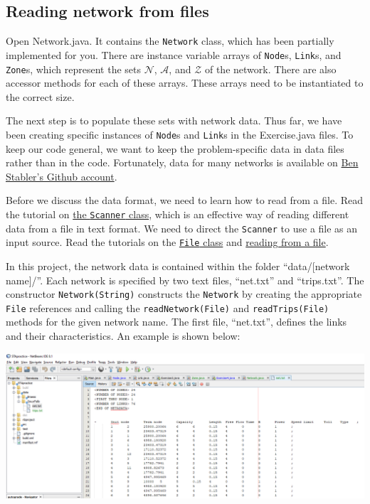 \documentclass[12pt]{article}
\newcommand{\N}{\mathcal{N}}
\newcommand{\A}{\mathcal{A}}
\newcommand{\Z}{\mathcal{Z}}
\begin{document}

\subsection{Reading network from files}
\label{sec33}


Open Network.java. It contains the \texttt{Network} class, which has been partially implemented for you. There are instance variable arrays of \texttt{Node}s, \texttt{Link}s, and \texttt{Zone}s, which represent the sets $\N$, $\A$, and $\Z$ of the network. There are also accessor methods for each of these arrays. These arrays need to be instantiated to the correct size. 

The next step is to populate these sets with network data. Thus far, we have been creating specific instances of \texttt{Node}s and \texttt{Link}s in the Exercise.java files. To keep our code general, we want to keep the problem-specific data in data files rather than in the code. Fortunately, data for many networks is available on \href{https://github.com/bstabler/TransportationNetworks}{Ben Stabler's Github account}. 


Before we discuss the data format, we need to learn how to read from a file. Read the tutorial on  \href{https://www.w3schools.com/java/java_user_input.asp}{the \texttt{Scanner} class}, which is an effective way of reading different data from a file in text format. We need to direct the \texttt{Scanner} to use a file as an input source. Read the tutorials on the \href{https://www.w3schools.com/java/java_files.asp}{\texttt{File} class} and \href{https://www.w3schools.com/java/java_files_read.asp}{reading from a file}. 

In this project, the network data is contained within the folder ``data/[network name]/''. Each network is specified by two text files, ``net.txt'' and ``trips.txt''.  The constructor \texttt{Network(String)} constructs the \texttt{Network} by creating the appropriate \texttt{File} references and calling the \texttt{readNetwork(File)} and \texttt{readTrips(File)} methods for the given network name. 
%
The first file, ``net.txt'', defines the links and their characteristics. An example is shown below:

\begin{center}
	\includegraphics[width=\textwidth]{netbeans6.png}
\end{center}
\end{document}
